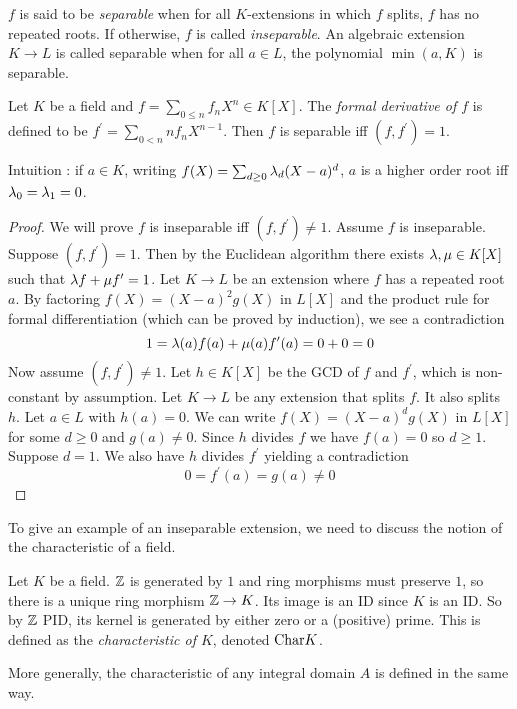 \documentclass{article}
\begin{document}
\begin{dfn} 

  $f$ is said to be \emph{separable} when 
  for all $K$-extensions in which $f$ splits, $f$ has no repeated roots. 
  If otherwise, $f$ is called \emph{inseparable}. 
  An algebraic extension $K \to L$ is called 
  separable when for all $a \in L$,
  the polynomial $\min(a , K)$ is separable.
\end{dfn}

\begin{prop}
  
  Let $K$ be a field and $f = \sum_{0 \leq n} f_n X^n \in K[X]$. 
  The \emph{formal derivative of $f$} is defined to be 
  $f^\prime = \sum_{0 < n} n f_n X^{n-1}$. 
  Then $f$ is separable iff $(f , f^\prime) = 1$.
\end{prop}
Intuition : if $a \in K$, writing $f(X) = \sum_{d \geq 0} \lambda_d (X - a)^d$,
$a$ is a higher order root iff $\lambda_0 = \lambda_1 = 0$.
\begin{proof}
  We will prove $f$ is inseparable iff $(f , f^\prime) \neq 1$.
  Assume $f$ is inseparable.
  Suppose $(f , f^\prime) = 1$.
  Then by the Euclidean algorithm there exists
  $\lambda, \mu \in K[X]$ such that $\lambda f + \mu f^\prime = 1$.
  Let $K \to L$ be an extension where $f$ has a repeated root $a$.
  By factoring $f(X) = (X - a)^2 g(X)$ in $L[X]$ and the product rule
  for formal differentiation (which can be proved by induction),
  we see a contradiction \[
    1 = \lambda(a) f(a) + \mu(a) f^\prime(a) = 0 + 0 = 0
  \]
  Now assume $(f , f^\prime) \neq 1$.
  Let $h \in K[X]$ be the GCD of $f$ and $f^\prime$,
  which is non-constant by assumption.
  Let $K \to L$ be any extension that splits $f$.
  It also splits $h$.
  Let $a \in L$ with $h(a) = 0$.
  We can write $f(X) = (X - a)^d g(X)$ in $L[X]$ for some $d \geq 0$
  and $g(a) \neq 0$.
  Since $h$ divides $f$ we have $f(a) = 0$ so $d \geq 1$.
  Suppose $d = 1$.
  We also have $h$ divides $f^\prime$ yielding a contradiction \[
    0 = f^\prime(a) = g(a) \neq 0
  \]
\end{proof}

To give an example of an inseparable extension,
we need to discuss the notion of the characteristic of a field.

\begin{dfn}  
  
  Let $K$ be a field. 
  $\mathbb{Z}$ is generated by $1$ and ring morphisms must preserve $1$, 
  so there is a unique ring morphism $\mathbb{Z} \to K$.
  Its image is an ID since $K$ is an ID.
  So by $\mathbb{Z}$ PID, its kernel is generated by either zero or a (positive) prime. 
  This is defined as the \emph{characteristic of $K$},
  denoted $\mathrm{Char}K$.

  More generally, the characteristic of any integral domain $A$
  is defined in the same way.
\end{dfn}
\end{document}
